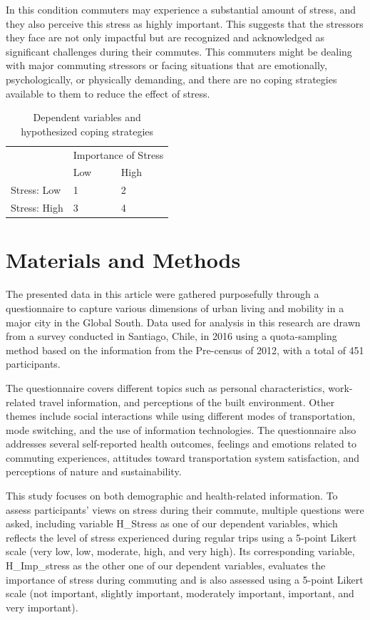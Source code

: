 \documentclass[
11pt, %
oneside, %
english, %
singlespacing, %
]{macthesis} %
\begin{document}
In this condition commuters may experience a substantial amount of stress, and they also perceive this stress as highly important. This suggests that the stressors they face are not only impactful but are recognized and acknowledged as significant challenges during their commutes. This commuters might be dealing with major commuting stressors or facing situations that are emotionally, psychologically, or physically demanding, and there are no coping strategies available to them to reduce the effect of stress.
\begin{table}[!h]

\caption{\label{tab:hypothesis}\label{tab:hypotheses}Dependent variables and hypothesized coping strategies}
\centering
\begin{tabular}[t]{lll}
\toprule
\multicolumn{1}{c}{} & \multicolumn{2}{c}{Importance of Stress} \\
\cmidrule(l{3pt}r{3pt}){2-3}
 & Low & High\\
\midrule
Stress: Low & 1 & 2\\
Stress: High & 3 & 4\\
\bottomrule
\end{tabular}
\end{table}
\hypertarget{materials-and-methods}{%
\section{Materials and Methods}\label{materials-and-methods}}

The presented data in this article were gathered purposefully through a questionnaire to capture various dimensions of urban living and mobility in a major city in the Global South. Data used for analysis in this research are drawn from a survey conducted in Santiago, Chile, in 2016 using a quota-sampling method based on the information from the Pre-census of 2012, with a total of 451 participants.

The questionnaire covers different topics such as personal characteristics, work-related travel information, and perceptions of the built environment. Other themes include social interactions while using different modes of transportation, mode switching, and the use of information technologies. The questionnaire also addresses several self-reported health outcomes, feelings and emotions related to commuting experiences, attitudes toward transportation system satisfaction, and perceptions of nature and sustainability.

This study focuses on both demographic and health-related information. To assess participants' views on stress during their commute, multiple questions were asked, including variable H\_Stress as one of our dependent variables, which reflects the level of stress experienced during regular trips using a 5-point Likert scale (very low, low, moderate, high, and very high). Its corresponding variable, H\_Imp\_stress as the other one of our dependent variables, evaluates the importance of stress during commuting and is also assessed using a 5-point Likert scale (not important, slightly important, moderately important, important, and very important).
\end{document}
